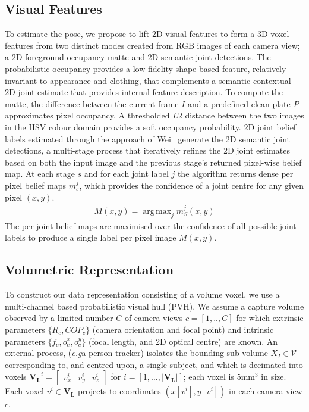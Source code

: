 \documentclass{bmvc2k}
\DeclareMathOperator*{\argmax}{arg\,max}
\newcommand{\squeezeup}{\vspace{-2mm}}
\newcommand{\eg}{e.\,g.\xspace}
\def\eg{\emph{e.g}\bmvaOneDot}
\begin{document}
\subsection{Visual Features }
\label{sec:2DDectections}
To estimate the pose, we propose to lift 2D visual features to form a 3D voxel features from two distinct modes created from RGB images of each camera view; a 2D foreground occupancy matte and 2D semantic joint detections. The probabilistic occupancy provides a low fidelity shape-based feature, relatively invariant to appearance and clothing, that complements a semantic contextual 2D joint estimate that provides internal feature description. To compute the matte, the difference between the current frame $I$ and a predefined clean plate $P$  approximates pixel occupancy. A thresholded $L2$ distance between the two images in the HSV colour domain provides a soft occupancy probability. 2D joint belief labels estimated through the approach of Wei~\cite{wei2016cpm,cao2017realtime} generate the 2D semantic joint detections, a multi-stage process that iteratively refines the 2D joint estimates based on both the input image and the previous stage’s returned pixel-wise belief map. At each stage $s$ and for each joint label $j$ the algorithm returns dense per pixel belief maps $m^{j}_{s}$, which provides the confidence of a joint centre for any given pixel $(x,y)$. 
\begin{eqnarray}
M(x,y) = \argmax_{j} m_{S}^{j}(x,y) \label{eq:beliefmap}
\end{eqnarray}
The per joint belief maps are maximised over the confidence of all possible joint labels to produce a single label per pixel image $M(x,y)$. 
\squeezeup

\subsection{Volumetric Representation}
\label{sec:PVH}


To construct our data representation consisting of a volume voxel, we use a multi-channel based probabilistic visual hull (PVH). 
We assume a capture volume  observed by a limited number $C$ of camera views $c=\left[ 1,..,C \right]$ for which extrinsic parameters $\{R_c, {COP}_c\}$ (camera orientation and focal point) and intrinsic parameters $\{f_c, o^x_c, o^y_c\}$ (focal length, and 2D optical centre) are known. An external process, (\eg a person tracker) isolates the bounding sub-volume $X_I \in \mathcal{V}$  corresponding to, and centred upon, a single subject, and which  is decimated into voxels $\mathbf{V_L}^i=\left[\begin{array}{ccc} v_x^i &v_y^i &v_z^i \end{array}\right]$ for $i=\left[1, \dots, |\mathbf{V_L}|\right]$; each voxel is $5 \mathrm{mm}^3$ in size. Each voxel $v^i \in \mathbf{V_L}$ projects to coordinates $(x[v^i],y[v^i])$ in each camera view $c$.
\end{document}

